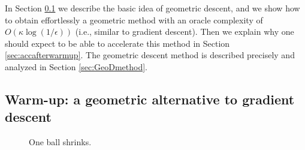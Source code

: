 In Section \ref{sec:warmup} we describe the basic idea of geometric descent, and we show how to obtain effortlessly a geometric method with an oracle complexity of $O(\kappa \log(1/\epsilon))$ (i.e., similar to gradient descent). Then we explain why one should expect to be able to accelerate this method in Section \ref{sec:accafterwarmup}. The geometric descent method is described precisely and analyzed in Section \ref{sec:GeoDmethod}.

\subsection{Warm-up: a geometric alternative to gradient descent} \label{sec:warmup}
\begin{figure}
\begin{center}
\end{center}
\caption{One ball shrinks.}
\label{fig:one_ball}
\end{figure}

